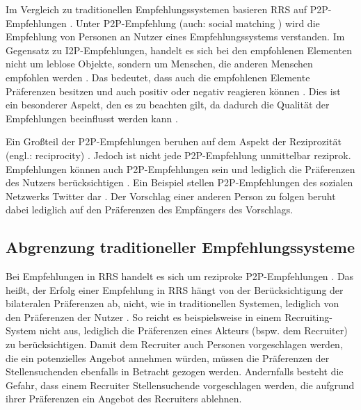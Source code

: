 Im Vergleich zu traditionellen Empfehlungssystemen basieren \ac{RRS} auf \ac{P2P}-Empfehlungen \cite[S. 207]{pizzato:2010}.
Unter \ac{P2P}-Empfehlung (auch: social matching \cite[S. 208]{pizzato:2010}) wird die Empfehlung von Personen an Nutzer eines Empfehlungssystems verstanden.
Im Gegensatz zu \ac{I2P}-Empfehlungen, handelt es sich bei den empfohlenen Elementen nicht um leblose Objekte, sondern um Menschen, die anderen Menschen empfohlen werden \cite[S. 2]{kazienko:inbook}.
Das bedeutet, dass auch die empfohlenen Elemente Präferenzen besitzen und auch positiv oder negativ reagieren können \cite[S. 2]{kazienko:inbook}.
Dies ist ein besonderer Aspekt, den es zu beachten gilt, da dadurch die Qualität der Empfehlungen beeinflusst werden kann \cite[S. 208]{pizzato:2010}\cite[S. 2199]{akehurst:inproceedings}.

Ein Großteil der \ac{P2P}-Empfehlungen beruhen auf dem Aspekt der Reziprozität (engl.: reciprocity) \cite[S. 545]{koprinska:inbook}.
Jedoch ist nicht jede \ac{P2P}-Empfehlung unmittelbar reziprok.
Empfehlungen können auch \ac{P2P}-Empfehlungen sein und lediglich die Präferenzen des Nutzers berücksichtigen \cite[S. 2429]{palomares:inproceedings}.
Ein Beispiel stellen \ac{P2P}-Empfehlungen des sozialen Netzwerks Twitter dar \cite[S. 2429]{palomares:inproceedings}.
Der Vorschlag einer anderen Person zu folgen beruht dabei lediglich auf den Präferenzen des Empfängers des Vorschlags.

\subsection{Abgrenzung traditioneller Empfehlungssysteme}
\label{ch:empfehlungssysteme:rrs:traditional_vs_rrs}
Bei Empfehlungen in \ac{RRS} handelt es sich um reziproke \ac{P2P}-Empfehlungen \cite[S. 207]{pizzato:2010}.
Das heißt, der Erfolg einer Empfehlung in \ac{RRS} hängt von der Berücksichtigung der bilateralen Präferenzen ab, nicht, wie in traditionellen Systemen, lediglich von den Präferenzen der Nutzer \cite[S. 1468]{yildirim:article}.
So reicht es beispielsweise in einem Recruiting-System nicht aus, lediglich die Präferenzen eines Akteurs (bspw. dem Recruiter) zu berücksichtigen.
Damit dem Recruiter auch Personen vorgeschlagen werden, die ein potenzielles Angebot annehmen würden, müssen die Präferenzen der Stellensuchenden ebenfalls in Betracht gezogen werden.
Andernfalls besteht die Gefahr, dass einem Recruiter Stellensuchende vorgeschlagen werden, die aufgrund ihrer Präferenzen ein Angebot des Recruiters ablehnen.

